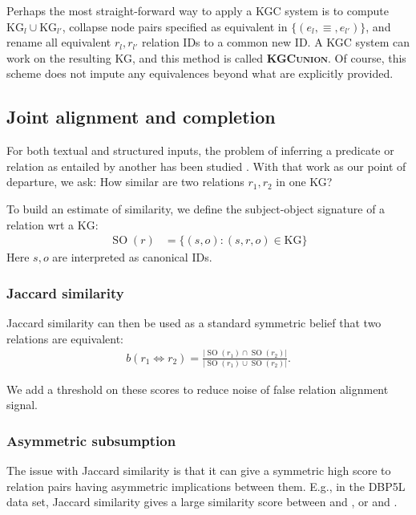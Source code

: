 \documentclass[11pt]{article}
\DeclareMathOperator{\SO}{SO}
\def\KG{\ensuremath{\text{KG}}}
\def\KbcUnion{\textsc{KGC\-union}}
\begin{document}
Perhaps the most straight-forward way to apply a KGC system is to compute $\KG_{l} \cup \KG_{l'}$, collapse node pairs specified as equivalent in $\{(e_{l},\equiv,e_{l'})\}$, and rename all equivalent $r_{l}, r_{l'}$ relation IDs to a common new ID. A KGC system can work on the resulting KG, and this method is called \textbf{\KbcUnion{}}.  Of course, this scheme does not impute any equivalences beyond what are explicitly provided.

\subsection{Joint alignment and completion}

For both textual and structured inputs, the problem of inferring a predicate or relation as entailed by another has been studied \citep{lin2001dirt, bhagat-etal-2007-ledir, nakashole-etal-2012-patty}.  With that work as our point of departure, we ask: How similar are two relations $r_1, r_2$ in one KG?

To build an estimate of similarity, we define the subject-object signature of a relation wrt a \KG:
\begin{align}
  \SO(r) &= \{ (s,o):  (s,r,o) \in \KG \}
\end{align}
Here $s,o$ are interpreted as canonical IDs.


\subsubsection{Jaccard similarity}

Jaccard similarity can then be used as a standard symmetric belief that two relations are equivalent:
\begin{align}
b(r_1\Leftrightarrow r_2) = \frac{|\SO(r_1)\cap\SO(r_2)|}{|\SO(r_1)\cup\SO(r_2)|}.
\end{align}

We add a threshold on these scores to reduce noise of false relation alignment signal. 


\subsubsection{Asymmetric subsumption}

The issue with Jaccard similarity is that it can give a symmetric high score to relation pairs having asymmetric implications between them.  E.g., in the DBP5L data set, Jaccard similarity gives a large similarity score between  and , or  and .
\end{document}
